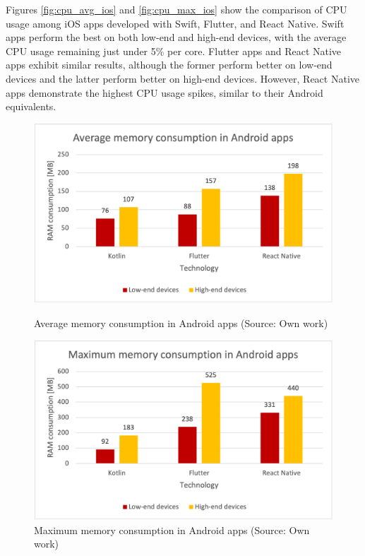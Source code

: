 Figures \ref{fig:cpu_avg_ios} and \ref{fig:cpu_max_ios} show the comparison of CPU usage among iOS apps developed with Swift, Flutter, and React Native. Swift apps perform the best on both low-end and high-end devices, with the average CPU usage remaining just under 5\% per core. Flutter apps and React Native apps exhibit similar results, although the former perform better on low-end devices and the latter perform better on high-end devices. However, React Native apps demonstrate the highest CPU usage spikes, similar to their Android equivalents.

\begin{figure}[H]
    \begin{minipage}{.48\textwidth}
        \includegraphics[width=\textwidth]{img/ram_average_android}
        \caption{Average memory consumption in Android apps (Source: Own work)}
        \label{fig:ram_avg_android}
    \end{minipage}
    \hfill
    \begin{minipage}{.48\textwidth}
        \includegraphics[width=\textwidth]{img/ram_max_android}
        \caption{Maximum memory consumption in Android apps (Source: Own work)}
        \label{fig:ram_max_android}
    \end{minipage}
\end{figure}

